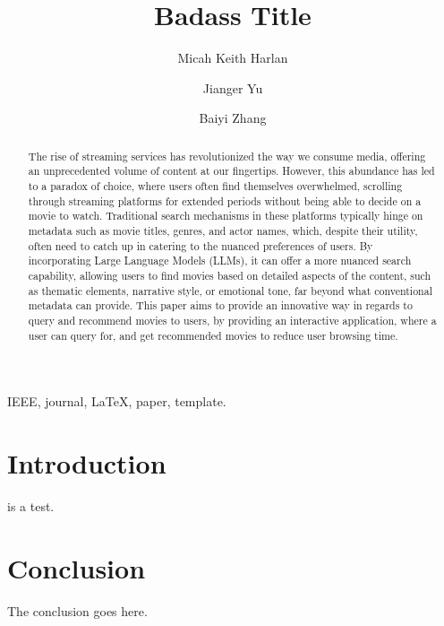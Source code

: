 \documentclass[journal]{IEEEtran}
\begin{document}
\title{Badass Title}

\author[1]{Micah Keith Harlan}
\author[1]{Jianger Yu}
\author[1]{Baiyi Zhang}


\maketitle

\begin{abstract}
The rise of streaming services has revolutionized the way we consume media, offering an unprecedented volume of content at our fingertips. However, this abundance has led to a paradox of choice, where users often find themselves overwhelmed, scrolling through streaming platforms for extended periods without being able to decide on a movie to watch. Traditional search mechanisms in these platforms typically hinge on metadata such as movie titles, genres, and actor names, which, despite their utility, often need to catch up in catering to the nuanced preferences of users. By incorporating Large Language Models (LLMs), it can offer a more nuanced search capability, allowing users to find movies based on detailed aspects of the content, such as thematic elements, narrative style, or emotional tone, far beyond what conventional metadata can provide. This paper aims to provide an innovative way in regards to query and recommend movies to users, by providing an interactive application, where a user can query for, and get recommended movies to reduce user browsing time.
\end{abstract}

\begin{IEEEkeywords}
IEEE, journal, \LaTeX, paper, template.
\end{IEEEkeywords}

\section{Introduction}
 is a test\cite{manning2008introduction}.

\section{Conclusion}
The conclusion goes here.



\end{document}
